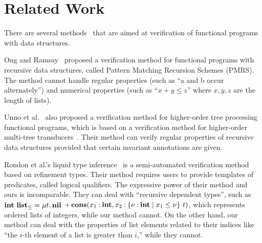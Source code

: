 \vspace{-5pt}
\section{Related Work}
\label{sec:related}

There are several
methods~\cite{Ong2011,Kobayashi2010,Unno2010,Rondon2008,Unno2009,Kawaguchi2009,Jhala2011,Xi1999,Xu2009,Xu2012,Chin2003,Suter2010,Suter2011}
that are aimed at verification of functional programs with data
structures.

Ong and Ramsay~\cite{Ong2011} proposed a verification method for 
functional programs with recursive data structures, called Pattern 
Matching Recursion Schemes (PMRS).  The method cannot handle regular 
properties (such as ``a and b occur alternately'') and numerical 
properties (such as ``$x+y \leq z$'' where $x,y,z$ are the length of 
lists).

Unno et al.~\cite{Unno2010} also proposed a verification method for 
higher-order tree processing functional programs, which is based on a 
verification method for higher-order multi-tree 
transducers~\cite{Kobayashi2010}.  Their method can verify regular 
properties of recursive data structures provided that certain invariant 
annotations are given.

Rondon et al.'s liquid type inference~\cite{Rondon2008,Kawaguchi2009} is 
a semi-automated verification method based on refinement types.  Their 
method requires users to provide templates of predicates, called logical 
qualifiers.  The expressive power of their method and ours is 
incomparable.  They can deal with ``recursive dependent types'', such as 
${\mathbf{int}}~{\mathbf{list}_\leq} = \mu t.\, \mathbf{nil}$ $\mathop{+} 
\mathbf{cons}({x_1\mathbin{:}\mathbf{int}},{x_2\mathbin{:}{\{\nu\mathbin{:}\mathbf{int} \mid x_1 \leq \nu\}}~{t}})$, 
which represents ordered lists of integers, while our method cannot. On 
the other hand, our method can deal with the properties of list elements 
related to their indices like ``the $i$-th element of a list is greater 
than $i$,'' while they cannot.

